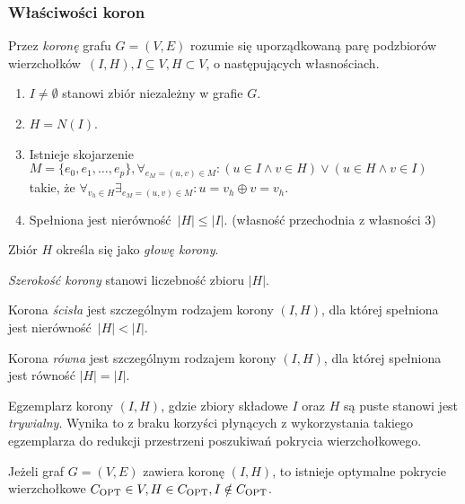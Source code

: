 \subsubsection{\textbf{Właściwości koron}}
\label{sss_kernelization_crown_main}
\begin{definition}
  Przez \emph{koronę} grafu $G=(V, E)$ rozumie się uporządkowaną parę podzbiorów wierzchołków $(I, H), I \subseteq V, H \subset V$, o następujących własnościach.
  \begin{enumerate}
    \item $I \neq \emptyset$ stanowi zbiór niezależny w grafie $G$.
    \item $H=N(I)$.
    \item Istnieje skojarzenie $M=\{e_0, e_1, \ldots, e_p\}, \forall_{e_M=(u,v) \in M}: (u\in I \land v\in H) \lor (u \in H \land v \in I)$ takie, że $\forall_{v_h \in H}\exists_{e_M=(u,v)\in M}: u = v_h \oplus v = v_h$.
    \item Spełniona jest nierówność $|H| \leq |I|$. (własność przechodnia z własności 3)
  \end{enumerate}
\end{definition}
\begin{definition}
  Zbiór $H$ określa się jako \emph{głowę korony}.
\end{definition}
\begin{definition}
  \emph{Szerokość korony} stanowi liczebność zbioru $|H|$.
\end{definition}
\begin{definition}
  Korona \emph{ścisła} jest szczególnym rodzajem korony $(I, H)$, dla której spełniona jest nierówność $|H| < |I|$.
\end{definition}
\begin{definition}
  Korona \emph{równa} jest szczególnym rodzajem korony $(I, H)$, dla której spełniona jest równość $|H| = |I|$.
\end{definition}
\begin{definition}
  Egzemplarz korony $(I, H)$, gdzie zbiory składowe $I$ oraz $H$ są puste stanowi jest \emph{trywialny}.
  Wynika to z braku korzyści płynących z wykorzystania takiego egzemplarza do redukcji przestrzeni poszukiwań pokrycia wierzchołkowego.
\end{definition}
\begin{theorem}
  Jeżeli graf $G=(V,E)$ zawiera koronę $(I,H)$, to istnieje optymalne pokrycie wierzchołkowe $C_{\textnormal{OPT}} \in V, H \in C_{\textnormal{OPT}}, I \notin C_{\textnormal{OPT}}$.
\end{theorem}
